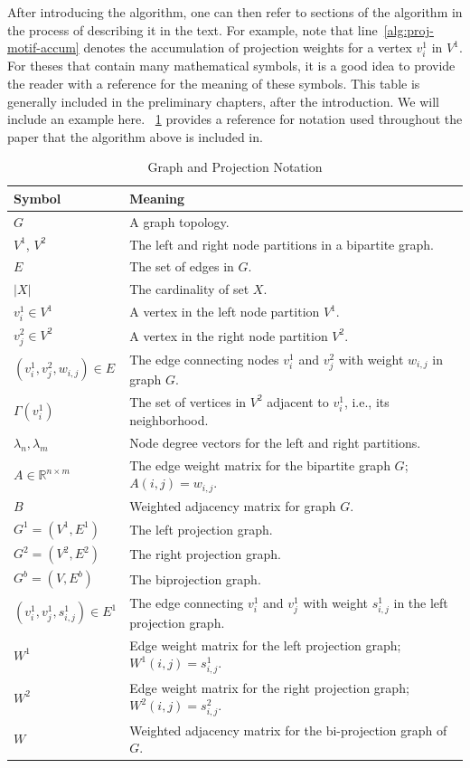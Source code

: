 After introducing the algorithm, one can then refer to sections of the algorithm in the process of describing it in the text. For example, note that line~\ref{alg:proj-motif-accum} denotes the accumulation of projection weights for a vertex $v_i^1$ in $V^1$. For theses that contain many mathematical symbols, it is a good idea to provide the reader with a reference for the meaning of these symbols. This table is generally included in the preliminary chapters, after the introduction. We will include an example here. \tablename~\ref{tbl:notation-g} provides a reference for notation used throughout the paper that the algorithm above is included in.

\begin{table}[tb]
\caption {Graph and Projection Notation} \label{tbl:notation-g}
\centering
\small
 \begin{tabular}{l l}
 \hline
 \textbf{Symbol} & \textbf{Meaning} \\ 
 \hline
 $G$ & A graph topology. \\
 $V^1$, $V^2$ & The left and right node partitions in a bipartite graph. \\
 $E$ & The set of edges in $G$. \\
 $|X|$ & The cardinality of set $X$. \\
 $v^1_i \in V^1$ & A vertex in the left node partition $V^1$. \\
 $v^2_j \in V^2$ & A vertex in the right node partition $V^2$. \\
 $(v^1_i, v^2_j, w_{i,j})\in E$ & The edge connecting nodes $v^1_i$ and $v^2_j$ with weight $w_{i,j}$ in graph $G$. \\
 $\Gamma(v^1_i)$ & The set of vertices in $V^2$ adjacent to $v^1_i$, i.e., its neighborhood. \\
 $\lambda_n,\lambda_m$ & Node degree vectors for the left and right partitions.\\
 $A \in \mathbb{R}^{n\times m}$ & The edge weight matrix for the bipartite graph $G$; $A(i,j) = w_{i,j}$. \\
 $B$ & Weighted adjacency matrix for graph $G$.\\
 \hline
 $G^1 = (V^1, E^1)$ & The left projection graph.\\
 $G^2 = (V^2, E^2)$ & The right projection graph.\\
 $G^b = (V, E^b)$ & The biprojection graph.\\
 $(v^1_i, v^1_j, s^1_{i,j})\in E^1$ & The edge connecting $v^1_i$ and $v^1_j$ with weight $s^1_{i,j}$ in the left projection graph. \\
 $W^1$ & Edge weight matrix for the left projection graph; $W^1(i,j) = s^1_{i,j}$.\\
 $W^2$ & Edge weight matrix for the right projection graph; $W^2(i,j) = s^2_{i,j}$.\\
 $W$ & Weighted adjacency matrix for the bi-projection graph of $G$.\\
 \hline
 \end{tabular}
\end{table}


